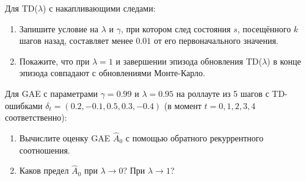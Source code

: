 \begin{exercise}
\label{ex:td-lambda}
Для TD($\lambda$) с накапливающими следами:
\begin{enumerate}[label=(\alph*)]
  \item Запишите условие на $\lambda$ и $\gamma$, при котором след состояния $s$, посещённого $k$ шагов назад, составляет менее $0.01$ от его первоначального значения.
  \item Покажите, что при $\lambda=1$ и завершении эпизода обновления TD($\lambda$) в конце эпизода совпадают с обновлениями Монте-Карло.
\end{enumerate}
\end{exercise}

\begin{exercise}
\label{ex:gae}
Для GAE с параметрами $\gamma=0.99$ и $\lambda=0.95$ на роллауте из 5 шагов с TD-ошибками $\delta_t = (0.2, -0.1, 0.5, 0.3, -0.4)$ (в момент $t=0,1,2,3,4$ соответственно):
\begin{enumerate}[label=(\alph*)]
  \item Вычислите оценку GAE $\hat A_0$ с помощью обратного рекуррентного соотношения.
  \item Каков предел $\hat A_0$ при $\lambda \to 0$?  При $\lambda \to 1$?
\end{enumerate}
\end{exercise}
